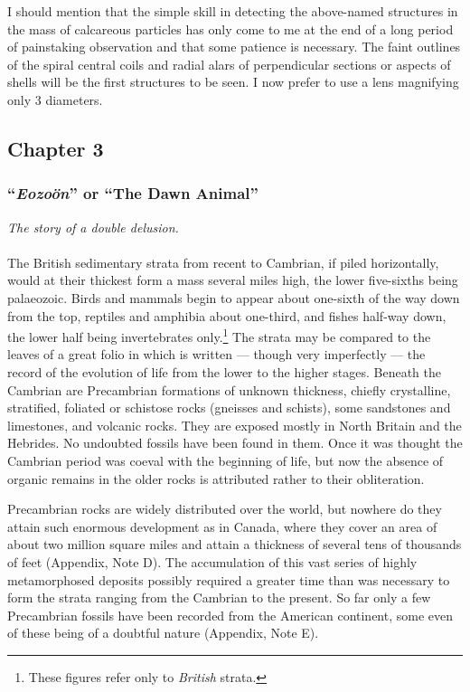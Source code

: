 \documentclass[a4paper, 12pt, oneside, landscape]{article}
\begin{document}
I should mention that the simple skill in detecting the above-named structures in the mass of calcareous particles has only come to me at the end of a long period of painstaking observation and that some patience is necessary. The faint outlines of the spiral central coils and radial alars of perpendicular sections or aspects of shells will be the first structures to be seen. I now prefer to use a lens magnifying only 3 diameters.
\clearpage
\subsection{Chapter 3}
\subsubsection{``\emph{Eozoön}'' or ``The Dawn Animal''}
\centerline{\emph{The story of a double delusion.}}
\paragraph{}
The British sedimentary strata from recent to Cambrian, if piled horizontally, would at their thickest form a mass several miles high, the lower five-sixths being palaeozoic. Birds and mammals begin to appear about one-sixth of the way down from the top, reptiles and amphibia about one-third, and fishes half-way down, the lower half being invertebrates only.\footnote{These figures refer only to \emph{British} strata.} The strata may be compared to the leaves of a great folio in which is written --- though very imperfectly --- the record of the evolution of life from the lower to the higher stages. Beneath the Cambrian are Precambrian formations of unknown thickness, chiefly crystalline, stratified, foliated or schistose rocks (gneisses and schists), some sandstones and limestones, and volcanic rocks. They are exposed mostly in North Britain and the Hebrides. No undoubted fossils have been found in them. Once it was thought the Cambrian period was coeval with the beginning of life, but now the absence of organic remains in the older rocks is attributed rather to their obliteration.

Precambrian rocks are widely distributed over the world, but nowhere do they attain such enormous development as in Canada, where they cover an area of about two million square miles and attain a thickness of several tens of thousands of feet (Appendix, Note D). The accumulation of this vast series of highly metamorphosed deposits possibly required a greater time than was necessary to form the strata ranging from the Cambrian to the present. So far only a few Precambrian fossils have been recorded from the American continent, some even of these being of a doubtful nature (Appendix, Note E).
\end{document}
